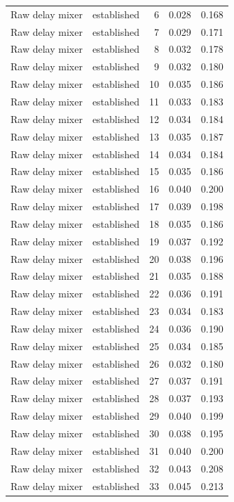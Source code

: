 \begin{tabular}{llrrr}
Raw delay mixer & established & 6 & 0.028 & 0.168 \\
Raw delay mixer & established & 7 & 0.029 & 0.171 \\
Raw delay mixer & established & 8 & 0.032 & 0.178 \\
Raw delay mixer & established & 9 & 0.032 & 0.180 \\
Raw delay mixer & established & 10 & 0.035 & 0.186 \\
Raw delay mixer & established & 11 & 0.033 & 0.183 \\
Raw delay mixer & established & 12 & 0.034 & 0.184 \\
Raw delay mixer & established & 13 & 0.035 & 0.187 \\
Raw delay mixer & established & 14 & 0.034 & 0.184 \\
Raw delay mixer & established & 15 & 0.035 & 0.186 \\
Raw delay mixer & established & 16 & 0.040 & 0.200 \\
Raw delay mixer & established & 17 & 0.039 & 0.198 \\
Raw delay mixer & established & 18 & 0.035 & 0.186 \\
Raw delay mixer & established & 19 & 0.037 & 0.192 \\
Raw delay mixer & established & 20 & 0.038 & 0.196 \\
Raw delay mixer & established & 21 & 0.035 & 0.188 \\
Raw delay mixer & established & 22 & 0.036 & 0.191 \\
Raw delay mixer & established & 23 & 0.034 & 0.183 \\
Raw delay mixer & established & 24 & 0.036 & 0.190 \\
Raw delay mixer & established & 25 & 0.034 & 0.185 \\
Raw delay mixer & established & 26 & 0.032 & 0.180 \\
Raw delay mixer & established & 27 & 0.037 & 0.191 \\
Raw delay mixer & established & 28 & 0.037 & 0.193 \\
Raw delay mixer & established & 29 & 0.040 & 0.199 \\
Raw delay mixer & established & 30 & 0.038 & 0.195 \\
Raw delay mixer & established & 31 & 0.040 & 0.200 \\
Raw delay mixer & established & 32 & 0.043 & 0.208 \\
Raw delay mixer & established & 33 & 0.045 & 0.213 \\

\end{tabular}
